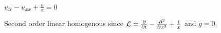 $u_{tt} - u_{xx} + \frac{u}{x} = 0$

\soln* Second order linear homogenous since $\mathcal{L} = \pdv{t} - \pdv[2]{x} + \over{x}$ and $g = 0$.